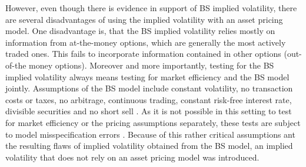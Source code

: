 However, even though there is evidence in support of \ac{BS} implied volatility, there are several disadvantages of using the implied volatility with an asset pricing model. One disadvantage is, that the \ac{BS} implied volatility relies mostly on information from at-the-money options, which are generally the most actively traded ones. This fails to incorporate information contained in other options (out-of-the money options). Moreover and more importantly, testing for the \ac{BS} implied volatility always means testing for market efficiency and the \ac{BS} model jointly. Assumptions of the \ac{BS} model include constant volatility, no transaction costs or taxes, no arbitrage, continuous trading, constant risk-free interest rate, divisible securities and no short sell \parencite{poon2003}. As it is not possible in this setting to test for market efficiency or the pricing assumptions separately, these tests are subject to model misspecification errors \parencite{jiang2003}. Because of this rather critical assumptions ant the resulting flaws of implied volatility obtained from the \ac{BS} model, an implied volatility that does not rely on an asset pricing model was introduced. 



